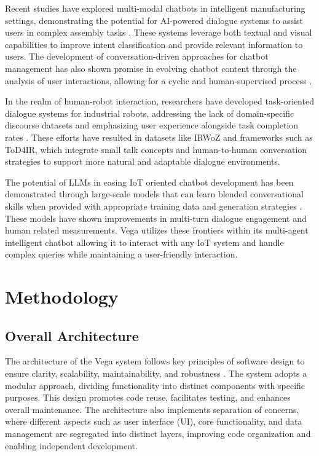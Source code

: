 \documentclass[lettersize,journal]{IEEEtran}
\begin{document}
Recent studies have explored multi-modal chatbots in intelligent manufacturing settings, demonstrating the potential for AI-powered dialogue systems to assist users in complex assembly tasks \cite{9440470}. These systems leverage both textual and visual capabilities to improve intent classification and provide relevant information to users. The development of conversation-driven approaches for chatbot management has also shown promise in evolving chatbot content through the analysis of user interactions, allowing for a cyclic and human-supervised process \cite{9681834}.

In the realm of human-robot interaction, researchers have developed task-oriented dialogue systems for industrial robots, addressing the lack of domain-specific discourse datasets and emphasizing user experience alongside task completion rates \cite{9869659}. These efforts have resulted in datasets like IRWoZ and frameworks such as ToD4IR, which integrate small talk concepts and human-to-human conversation strategies to support more natural and adaptable dialogue environments.



The potential of LLMs in easing IoT oriented chatbot development has been demonstrated through large-scale models that can learn blended conversational skills when provided with appropriate training data and generation strategies \cite{roller-etal-2021-recipes}. These models have shown improvements in multi-turn dialogue engagement and human related measurements. Vega utilizes these frontiers within its multi-agent intelligent chatbot allowing it to interact with any IoT system and handle complex queries while maintaining a user-friendly interaction.

\section{Methodology}\label{sec:methodology}

\subsection{Overall Architecture}
The architecture of the Vega system follows key principles of software design to ensure clarity, scalability, maintainability, and robustness \cite{taylor2010software}. The system adopts a modular approach, dividing functionality into distinct components with specific purposes. This design promotes code reuse, facilitates testing, and enhances overall maintenance. The architecture also implements separation of concerns, where different aspects such as user interface (UI), core functionality, and data management are segregated into distinct layers, improving code organization and enabling independent development.
\end{document}

